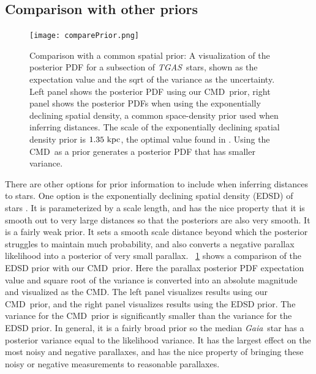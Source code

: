 \documentclass[modern]{aastex61}
\newcommand{\acronym}[1]{{\small{#1}}}
\newcommand{\project}[1]{\textsl{#1}}
\newcommand{\tgas}{\project{\acronym{TGAS}}}
\newcommand{\gaia}{\project{Gaia}}
\newcommand{\cmd}{\acronym{CMD}}
\begin{document}
\subsection{Comparison with other priors}
\begin{figure}
\centering
  \texttt{[image: comparePrior.png]}
\caption{Comparison with a common spatial prior: A visualization of the posterior PDF for a subsection of \tgas\ stars, shown as the expectation value and the sqrt of the variance as the uncertainty. Left panel shows the posterior PDF using our \cmd\ prior, right panel shows the posterior PDFs when using the exponentially declining spatial density, a common space-density prior used when inferring distances. The scale of the exponentially declining spatial density prior is $1.35~{\rm kpc}$, the optimal value found in \cite{astraatmadja16a}. Using the \cmd\ as a prior generates a posterior PDF that has smaller variance.}
\label{fig:comparePrior}
\end{figure}

There are other options for prior information to include when inferring distances to stars.
One option is the exponentially declining spatial density (EDSD) of stars \citep{astraatmadja16a}.
It is parameterized by a scale length, and has the nice property that it is smooth out to very large distances so that the posteriors are also very smooth.
It is a fairly weak prior.
It sets a smooth scale distance beyond which the posterior struggles to maintain much probability, and also converts a negative parallax likelihood into a posterior of very small parallax.
\figurename~\ref{fig:comparePrior} shows a comparison of the EDSD prior with our \cmd\ prior.
Here the parallax posterior PDF expectation value and square root of the variance is converted into an absolute magnitude and visualized as the \cmd.
The left panel visualizes results using our \cmd\ prior, and the right panel visualizes results using the EDSD prior.
The variance for the \cmd\ prior is significantly smaller than the variance for the EDSD prior.
In general, it is a fairly broad prior so the median \gaia\ star has a posterior variance equal to the likelihood variance.
It has the largest effect on the most noisy and negative parallaxes, and has the nice property of bringing these noisy or negative measurements to reasonable parallaxes.
\end{document}
